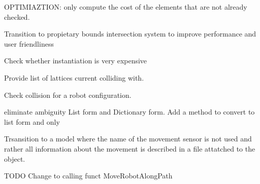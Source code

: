 
\begin{DoxyRefList}
\item[Member \mbox{\hyperlink{class_illa_graph_node_a536aace3c5276651d6870f318f897e02}{Illa\+Graph\+Node.Order\+Dictionary\+Reach\+From\+Origin}} ()]\label{todo__todo000001}%
%
OPTIMIAZTION\+: only compute the cost of the elements that are not already checked.  
\item[Class \mbox{\hyperlink{class_illa_node_sensor_script}{Illa\+Node\+Sensor\+Script}} ]\label{todo__todo000002}%
%
Transition to propietary bounds intersection system to improve performance and user friendliness  
\item[Member \mbox{\hyperlink{class_inchworm_robot_controller_a434da4643498bd898d99a63678492ae4}{Inchworm\+Robot\+Controller.Is\+Pose\+Colliding}} (\mbox{\hyperlink{class_pos_j}{PosJ}} Pose\+To\+Check)]\label{todo__todo000003}%
%
Check whether instantiation is very expensive

\label{todo__todo000004}%
%
Provide list of lattices current colliding with.

\label{todo__todo000005}%
%
Check collision for a robot configuration.  
\item[Class \mbox{\hyperlink{class_movement}{Movement}} ]\label{todo__todo000006}%
%
eliminate ambiguity List form and Dictionary form. Add a method to convert to list form and only  
\item[Member \mbox{\hyperlink{class_robot_script_aaaacc0eacd09c68f0e399dfb780c16a3}{Robot\+Script.Get\+Possible\+Movement\+Sensors}} ()]\label{todo__todo000007}%
%
Trsansition to a model where the name of the movement sensor is not used and rather all information about the movement is described in a file attatched to the object. ~\newline
  
\item[Member \mbox{\hyperlink{class_robot_script_a9213947f626c88acf4ce793020a9ef3d}{Robot\+Script.Move\+To\+Node}} (Game\+Object End\+Node)]\label{todo__todo000008}%
%
TODO Change to calling funct Move\+Robot\+Along\+Path 
\end{DoxyRefList}